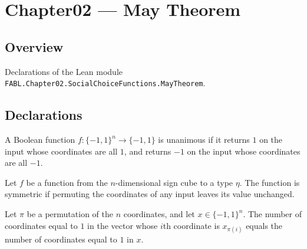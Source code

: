 \chapter{Chapter02 — May Theorem}
\section{Overview}

Declarations of the Lean module \texttt{FABL.Chapter02.SocialChoiceFunctions.MayTheorem}.

\section{Declarations}

\begin{definition}
\label{FABL.IsUnanimous}
\leanok
{}
A Boolean function $f\colon\{-1,1\}^n\to\{-1,1\}$ is unanimous if it returns $1$ on the
input whose coordinates are all $1$, and returns $-1$ on the input whose coordinates are
all $-1$.
\end{definition}

\begin{definition}
\label{FABL.IsSymmetric}
\leanok
{}
Let $f$ be a function from the $n$-dimensional sign cube to a type $\eta$. The function
is symmetric if permuting the coordinates of any input leaves its value unchanged.
\end{definition}

\begin{theorem}
\label{FABL.positiveCoordinateCount_permuteInput}
\leanok
{}
Let $\pi$ be a permutation of the $n$ coordinates, and let $x\in\{-1,1\}^n$. The
number of coordinates equal to $1$ in the vector whose $i$th coordinate is $x_{\pi(i)}$
equals the number of coordinates equal to $1$ in $x$.
\end{theorem}

